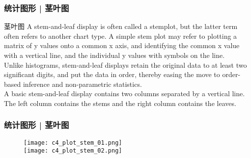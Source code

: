 \begin{frame}
  \frametitle{统计图形 | 茎叶图}
  \begin{block}{茎叶图}
A stem-and-leaf display is often called a stemplot, but the latter term often refers to another chart type. A simple stem plot may refer to plotting a matrix of y values onto a common x axis, and identifying the common x value with a vertical line, and the individual y values with symbols on the line.\\
\vspace{0.5em}
Unlike histograms, stem-and-leaf displays retain the original data to at least two significant digits, and put the data in order, thereby easing the move to order-based inference and non-parametric statistics.\\
\vspace{0.5em}
A basic stem-and-leaf display contains two columns separated by a vertical line. The left column contains the stems and the right column contains the leaves.
  \end{block}
\end{frame}

\begin{frame}
  \frametitle{统计图形 | 茎叶图}
  \begin{figure}
    \centering
    \texttt{[image: c4\_plot\_stem\_01.png]}\\
    \texttt{[image: c4\_plot\_stem\_02.png]}
  \end{figure}
\end{frame}

